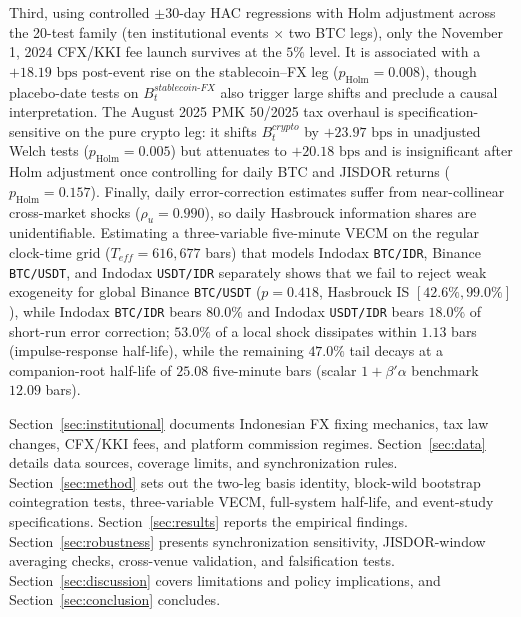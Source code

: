 Third, using controlled $\pm 30$-day HAC regressions with Holm adjustment across the 20-test family (ten institutional events $\times$ two BTC legs), only the November 1, 2024 CFX/KKI fee launch survives at the $5\%$ level. It is associated with a $+18.19\text{ bps}$ post-event rise on the stablecoin--FX leg ($p_{\text{Holm}} = 0.008$), though placebo-date tests on $B_t^{stablecoin\text{-}FX}$ also trigger large shifts and preclude a causal interpretation. The August 2025 PMK 50/2025 tax overhaul is specification-sensitive on the pure crypto leg: it shifts $B_t^{crypto}$ by $+23.97\text{ bps}$ in unadjusted Welch tests ($p_{\text{Holm}} = 0.005$) but attenuates to $+20.18\text{ bps}$ and is insignificant after Holm adjustment once controlling for daily BTC and JISDOR returns ($p_{\text{Holm}} = 0.157$). Finally, daily error-correction estimates suffer from near-collinear cross-market shocks ($\rho_u = 0.990$), so daily Hasbrouck information shares are unidentifiable. Estimating a three-variable five-minute VECM on the regular clock-time grid ($T_{eff} = 616,677$ bars) that models Indodax \texttt{BTC/IDR}, Binance \texttt{BTC/USDT}, and Indodax \texttt{USDT/IDR} separately shows that we fail to reject weak exogeneity for global Binance \texttt{BTC/USDT} ($p = 0.418$, Hasbrouck IS $[42.6\%, 99.0\%]$), while Indodax \texttt{BTC/IDR} bears $80.0\%$ and Indodax \texttt{USDT/IDR} bears $18.0\%$ of short-run error correction; $53.0\%$ of a local shock dissipates within $1.13$ bars (impulse-response half-life), while the remaining $47.0\%$ tail decays at a companion-root half-life of $25.08$ five-minute bars (scalar $1 + \beta'\alpha$ benchmark $12.09$ bars).

Section~\ref{sec:institutional} documents Indonesian FX fixing mechanics, tax law changes, CFX/KKI fees, and platform commission regimes. Section~\ref{sec:data} details data sources, coverage limits, and synchronization rules. Section~\ref{sec:method} sets out the two-leg basis identity, block-wild bootstrap cointegration tests, three-variable VECM, full-system half-life, and event-study specifications. Section~\ref{sec:results} reports the empirical findings. Section~\ref{sec:robustness} presents synchronization sensitivity, JISDOR-window averaging checks, cross-venue validation, and falsification tests. Section~\ref{sec:discussion} covers limitations and policy implications, and Section~\ref{sec:conclusion} concludes.
